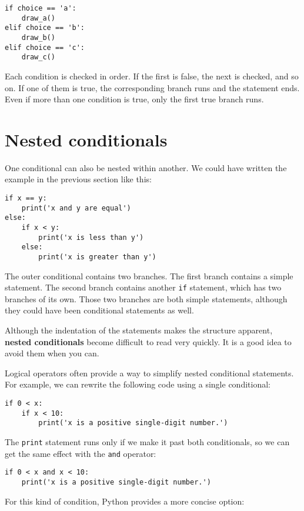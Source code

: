 \begin{verbatim}
if choice == 'a':
    draw_a()
elif choice == 'b':
    draw_b()
elif choice == 'c':
    draw_c()
\end{verbatim}
%
Each condition is checked in order.  If the first is false,
the next is checked, and so on.  If one of them is
true, the corresponding branch runs and the statement
ends.  Even if more than one condition is true, only the
first true branch runs.  


\section{Nested conditionals}

One conditional can also be nested within another.  We could have
written the example in the previous section like this:

\begin{verbatim}
if x == y:
    print('x and y are equal')
else:
    if x < y:
        print('x is less than y')
    else:
        print('x is greater than y')
\end{verbatim}
%
The outer conditional contains two branches.  The
first branch contains a simple statement.  The second branch
contains another {\tt if} statement, which has two branches of its
own.  Those two branches are both simple statements,
although they could have been conditional statements as well.

Although the indentation of the statements makes the structure
apparent, {\bf nested conditionals} become difficult to read very
quickly.  It is a good idea to avoid them when you can.

Logical operators often provide a way to simplify nested conditional
statements.  For example, we can rewrite the following code using a
single conditional:

\begin{verbatim}
if 0 < x:
    if x < 10:
        print('x is a positive single-digit number.')
\end{verbatim}
%
The {\tt print} statement runs only if we make it past both
conditionals, so we can get the same effect with the {\tt and} operator:

\begin{verbatim}
if 0 < x and x < 10:
    print('x is a positive single-digit number.')
\end{verbatim}

For this kind of condition, Python provides a more concise option:

